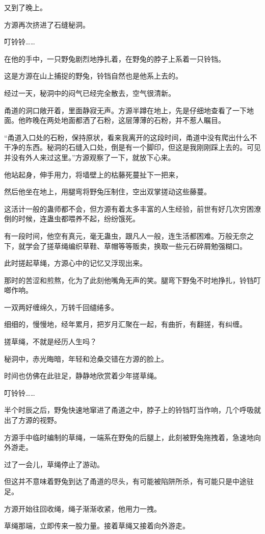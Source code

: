 \begin{this_body}
又到了晚上。

方源再次挤进了石缝秘洞。

叮铃铃……

在他的手中，一只野兔剧烈地挣扎着，在野兔的脖子上系着一只铃铛。

这是方源在山上捕捉的野兔，铃铛自然也是他系上去的。

经过一天，秘洞中的闷气已经完全散去，空气很清新。

甬道的洞口敞开着，里面静寂无声。方源半蹲在地上，先是仔细地查看了一下地面。他昨晚在两处地面都洒了石粉，这层薄薄的石粉，并不惹人瞩目。

“甬道入口处的石粉，保持原状，看来我离开的这段时间，甬道中没有爬出什么不干净的东西。秘洞的石缝入口处，倒是有一个脚印，但这是我刚刚踩上去的。可见并没有外人来过这里。”方源观察了一下，就放下心来。

他站起身，伸手用力，将墙壁上的枯藤死蔓扯下一把来，

然后他坐在地上，用腿弯将野兔压制住，空出双掌搓动这些藤蔓。

这活计一般的蛊师都不会，但方源有着太多丰富的人生经验，前世有好几次穷困潦倒的时候，连蛊虫都喂养不起，纷纷饿死。

有一段时间，他空有真元，毫无蛊虫，跟凡人一般，连生活都困难。万般无奈之下，就学会了搓草绳编织草鞋、草帽等等贩卖，换取一些元石碎屑勉强糊口。

此时搓起草绳，方源心中的记忆又浮现出来。

那时的苦涩和煎熬，化为了此刻他嘴角无声的笑。腿弯下野兔不时地挣扎，铃铛叮啷作响。

一双两好缠绵久，万转千回缱绻多。

细细的，慢慢地，经年累月，把岁月汇聚在一起，有曲折，有翻搓，有纠缠。

搓草绳，不就是经历人生吗？

秘洞中，赤光晦暗，年轻和沧桑交错在方源的脸上。

时间也仿佛在此驻足，静静地欣赏着少年搓草绳。

叮铃铃……

半个时辰之后，野兔快速地窜进了甬道之中，脖子上的铃铛叮当作响，几个呼吸就出了方源的视野。

方源手中临时编制的草绳，一端系在野兔的后腿上，此刻被野兔拖拽着，急速地向外游走。

过了一会儿，草绳停止了游动。

但这并不意味着野兔到达了甬道的尽头，有可能被陷阱所杀，有可能只是中途驻足。

方源开始往回收绳，绳子渐渐收紧，他用力一拽。

草绳那端，立即传来一股力量。接着草绳又接着向外游走。


\end{this_body}
